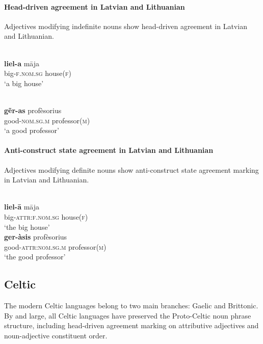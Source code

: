 \paragraph*{Head\hyp{}driven agreement in Latvian and Lithuanian} 
Adjectives modifying indefinite nouns show head\hyp{}driven agreement in Latvian and Lithuanian.
\begin{exe}
\ex 
\begin{xlist}
\\
\gll 	\textbf{liel-a} māja\\
	big-\textsc{f.nom.sg} house(\textsc{f})\\
\glt	‘a big house’

\\
\gll 	\textbf{gẽr-as}			profèsorius\\
	good-\textsc{nom.sg.m} professor(\textsc{m})\\
\glt	‘a good professor’
\end{xlist}
\end{exe}

\paragraph*{Anti\hyp{}construct state agreement in Latvian and Lithuanian}
Adjectives modifying definite nouns show anti\hyp{}construct state agreement marking in Latvian and Lithuanian.
\begin{exe}
\ex 
\begin{xlist}	
\\
\gll 	\textbf{liel-ā} māja\\
	big-\textsc{attr:f.nom.sg} house(\textsc{f})\\
\glt	‘the big house’
\\
\gll 	\textbf{ger-àsis}		profèsorius\\
	good-\textsc{attr:nom.sg.m}	professor(\textsc{m})\\
\glt	‘the good professor’
\end{xlist}
\end{exe}

\subsection{Celtic}
The modern Celtic languages belong to two main branches: Gaelic and Brittonic. By and large, all Celtic languages have preserved the Proto\hyp{}Celtic noun phrase structure, including head\hyp{}driven agreement marking on attributive adjectives and noun-adjective constituent order.

